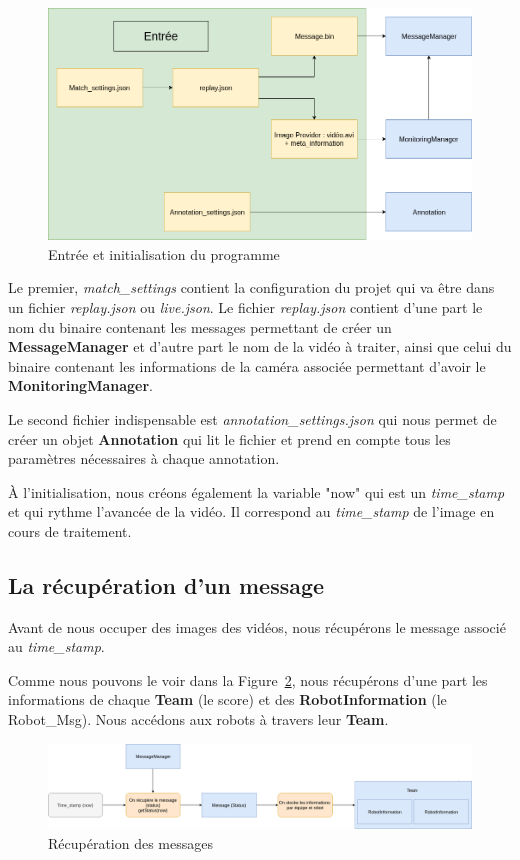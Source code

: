 \begin{figure}[H] 
\centering 
\includegraphics[scale = 0.3]{images/init.png}
    \caption{Entrée et initialisation du programme}
    \label{fig:entree}
\end{figure} 
\bigskip


Le premier, \textit{match\_settings} contient la configuration du
projet qui va être dans un fichier \textit{replay.json} ou
\textit{live.json}.
Le fichier \textit{replay.json} contient d'une part le nom du 
binaire contenant les messages permettant de créer un 
\textbf{MessageManager} et d'autre part le nom de la vidéo à 
traiter, ainsi que celui du binaire contenant les informations de
la caméra associée permettant d'avoir le
\textbf{MonitoringManager}.
\bigskip

Le second fichier indispensable est
\textit{annotation\_settings.json} qui nous permet de créer un 
objet \textbf{Annotation} qui lit le fichier et prend en compte 
tous les paramètres nécessaires à chaque annotation.

À l'initialisation, nous créons également la variable "now" qui 
est un \textit{time\_stamp} et qui rythme l'avancée de la vidéo. 
Il correspond au \textit{time\_stamp} de l'image en cours de 
traitement. 

\subsection{La récupération d'un message}

Avant de nous occuper des images des vidéos, nous récupérons le 
message associé au \textit{time\_stamp}. 

Comme nous pouvons le voir dans la Figure~\ref{fig:log}, nous 
récupérons d'une part les informations de chaque \textbf{Team} 
(le score) et des \textbf{RobotInformation} (le Robot\_Msg). Nous
accédons aux robots à travers leur \textbf{Team}.
\begin{figure}[H] 
\centering 
\includegraphics[scale = 0.24]{images/getmessage.png}
    \caption{Récupération des messages}
    \label{fig:log}
\end{figure} 


